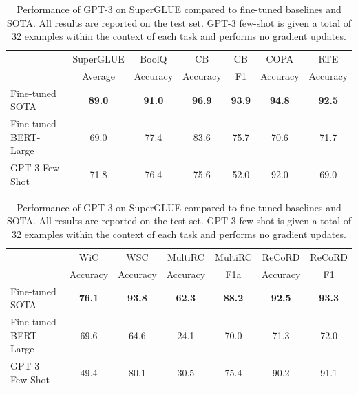 
\begin{table}
    
\begin{center}
\begin{tabular}{lcccccc}
\toprule
                 &  SuperGLUE &     BoolQ &        CB &    CB &      COPA &       RTE \\
                 &    Average &  Accuracy &  Accuracy &    F1 &  Accuracy &  Accuracy \\
\midrule
Fine-tuned SOTA & \textbf{89.0} & \textbf{91.0} & \textbf{96.9} & \textbf{93.9} & \textbf{94.8} & \textbf{92.5} \\        
 Fine-tuned BERT-Large &       69.0 &      77.4 &      83.6 &  75.7 &      70.6 &      71.7 \\
GPT-3 Few-Shot &       71.8 &      76.4 &      75.6 &  52.0 &      92.0 &      69.0 \\
\end{tabular}
\end{center}

\begin{center}
\begin{tabular}{lcccccc}
\toprule
                 &       WiC &       WSC &   MultiRC &  MultiRC &    ReCoRD &  ReCoRD \\
                 &  Accuracy &  Accuracy &  Accuracy &      F1a &  Accuracy &      F1 \\
\midrule
       Fine-tuned SOTA &   \textbf{76.1} &   \textbf{93.8} &   \textbf{62.3} &  \textbf{88.2} &   \textbf{92.5} & \textbf{93.3} \\
 Fine-tuned BERT-Large &      69.6 &      64.6 &      24.1 &     70.0 &      71.3 &    72.0 \\
        GPT-3 Few-Shot &      49.4 &      80.1 &      30.5 &     75.4 &      90.2 &    91.1 \\
\bottomrule
\end{tabular}
\end{center}

    \caption{
    Performance of GPT-3 on SuperGLUE compared to fine-tuned baselines and SOTA. All results are reported on the test set. GPT-3 few-shot is given a total of 32 examples within the context of each task and performs no gradient updates.
    }
    \label{table:superglue}
\end{table}
